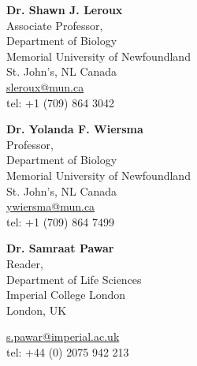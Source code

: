 \documentclass[12pt,letterpaper]{article}
\newcommand{\mhead}[1]{\leavevmode\marginpar{\sffamily\footnotesize #1}}
\begin{document}
\bigskip
\mhead{References}%
\begin{minipage}[t]{.33\textwidth}
  \raggedright
  \textbf{Dr. Shawn J. Leroux}\\
  Associate Professor,\\
  Department of Biology\\
  Memorial University of Newfoundland\\
  St. John's, NL Canada\\

  \noindent \href{mailto:sleroux@mun.ca}{sleroux@mun.ca}\\
  tel: +1 (709) 864 3042\\
\end{minipage}%
\begin{minipage}[t]{.33\textwidth}
  \raggedright
  \textbf{Dr. Yolanda F. Wiersma}\\
  Professor,\\
  Department of Biology\\
  Memorial University of Newfoundland\\
  St. John's, NL Canada\\

  \noindent \href{mailto:ywiersma@mun.ca}{ywiersma@mun.ca}\\
  tel: +1 (709) 864 7499
\end{minipage}%
\begin{minipage}[t]{.33\textwidth}
  \raggedright
  \textbf{Dr. Samraat Pawar}\\
  Reader,\\
  Department of Life Sciences\\
  Imperial College London\\
  London, UK

  \noindent \href{mailto:s.pawar@imperial.ac.uk}{s.pawar@imperial.ac.uk}\\
  tel: +44 (0) 2075 942 213
\end{minipage}
\end{document}
